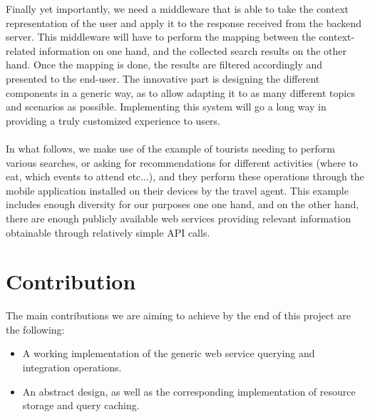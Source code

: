 Finally yet importantly, we need a middleware that is able to take the context representation of the user and apply it to the response received from the backend server. This middleware will have to perform the mapping between the context-related information on one hand, and the collected search results on the other hand. Once the mapping is done, the results are filtered accordingly and presented to the end-user. The innovative part is designing the different components in a generic way, as to allow adapting it to as many different topics and scenarios as possible. Implementing this system will go a long way in providing a truly customized experience to users.\\\\
In what follows, we make use of the example of tourists needing to perform various searches, or asking for recommendations for different activities (where to eat, which events to attend etc...), and they perform these operations through the mobile application installed on their devices by the travel agent. This example includes enough diversity for our purposes one one hand, and on the other hand, there are enough publicly available web services providing relevant information obtainable through relatively simple API calls.
\section{Contribution}
The main contributions we are aiming to achieve by the end of this project are the following:
\begin{itemize}
\item A working implementation of the generic web service querying and integration operations.
\item An abstract design, as well as the corresponding implementation of resource storage and query caching.
\end{itemize}
